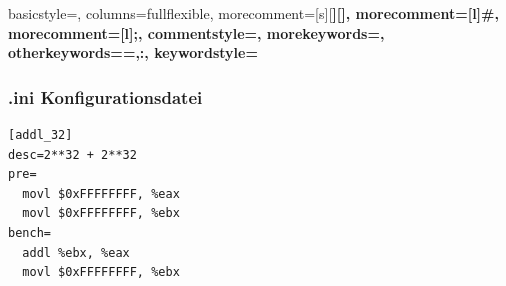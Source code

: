 \documentclass{beamer}
\begin{document}
\begin{frame}[fragile]
{
    basicstyle=\ttfamily\small,
    columns=fullflexible,
    morecomment=[s][\color{blue}\bfseries]{[}{]},
    morecomment=[l]{\#},
    morecomment=[l]{;},
    commentstyle=\color{gray}\ttfamily,
    morekeywords={},
    otherkeywords={=,:},
    keywordstyle={\color{green}\bfseries}
}

\lstset{language=Ini}
\frametitle{.ini Konfigurationsdatei} 

\begin{lstlisting}
[addl_32]
desc=2**32 + 2**32
pre=
  movl $0xFFFFFFFF, %eax
  movl $0xFFFFFFFF, %ebx
bench=
  addl %ebx, %eax
  movl $0xFFFFFFFF, %ebx
\end{lstlisting}
\end{frame}
\end{document}
